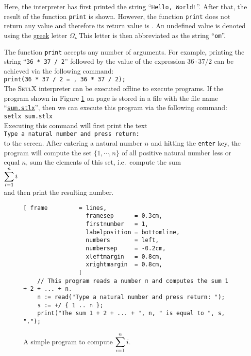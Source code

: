 Here, the interpreter has first printed the string ``\texttt{Hello, World!}''.  After that, the
result of the function \texttt{print} is shown.  However, the function \texttt{print} does not
return any value and therefore its return value is .  An undefined value is denoted using
the \href{http://en.wikipedia.org/wiki/Greek_alphabet}{greek} letter
\href{https://en.wikipedia.org/wiki/Omega}{$\Omega$.}  This letter is then
abbreviated as the string ``\texttt{om}''.

The function \texttt{print} accepts any number of arguments.  For example, printing
the string ``\texttt{36 * 37 / 2}'' followed by
the value of the expression $36 \cdot 37 / 2$ can be achieved via the following command:
\\[0.2cm]
\hspace*{1.3cm}
\texttt{print(36 * 37 / 2 = , 36 * 37 / 2);}
\\[0.2cm]
The  \textsc{SetlX} interpreter can be executed offline to execute programs.
If the program shown in Figure  \ref{fig:sum.stlx} on page \pageref{fig:sum.stlx} is stored in a
file with the file name  
``\href{https://github.com/karlstroetmann/Logik/blob/master/SetlX/sum.stlx}{\texttt{sum.stlx}}'',
then we can execute this program via the following command:
\\[0.2cm]
\hspace*{1.3cm}
\texttt{setlx sum.stlx}
\\[0.2cm] 
Executing this command will first print the text
\\[0.2cm]
\hspace*{1.3cm}
\texttt{Type a natural number and press return: } 
\\[0.2cm]
to the screen.  After entering a natural number $n$ and hitting the \texttt{enter} key, the program will
compute the set $\{1,\cdots,n\}$ of all positive natural number less or equal $n$, sum the elements
of this set, i.e.~compute the sum
\\[0.2cm]
\hspace*{1.3cm}
$\displaystyle\sum\limits_{i=1}^n i$ 
\\[0.2cm]
and then print the resulting number.

\begin{figure}[!ht]
\centering
\begin{Verbatim}[ frame         = lines, 
                  framesep      = 0.3cm, 
                  firstnumber   = 1,
                  labelposition = bottomline,
                  numbers       = left,
                  numbersep     = -0.2cm,
                  xleftmargin   = 0.8cm,
                  xrightmargin  = 0.8cm,
                ]
    // This program reads a number n and computes the sum 1 + 2 + ... + n.
    n := read("Type a natural number and press return: ");
    s := +/ { 1 .. n };
    print("The sum 1 + 2 + ... + ", n, " is equal to ", s, ".");
\end{Verbatim}
\vspace*{-0.3cm}
\caption{A simple program to compute $\displaystyle\sum\limits_{i=1}^n i$.}
\label{fig:sum.stlx}
\end{figure}


